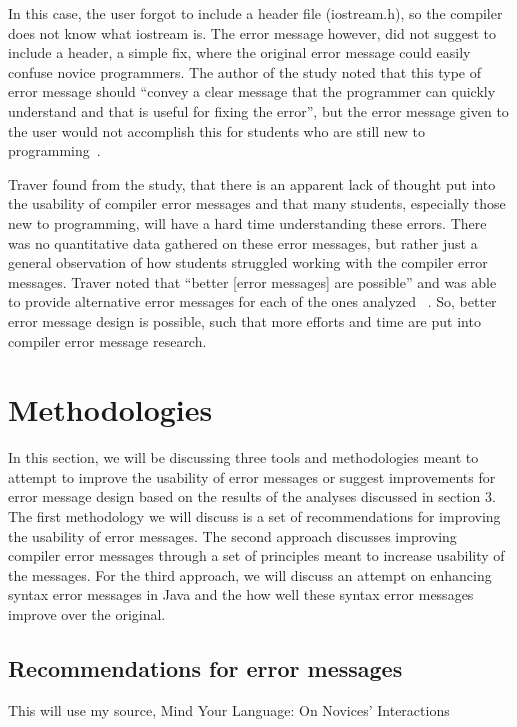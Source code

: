 \documentclass{sig-alternate}
\begin{document}

In this case, the user forgot to include a header file (iostream.h), so the compiler does not know what iostream is.
The error message however, did not suggest to include a header, a simple fix, where the original error message could easily confuse novice programmers.
The author of the study noted that this type of error message should ``convey a clear message that the programmer can quickly understand and that is useful for fixing the error'', but the error message given to the user would not accomplish this for students who are still new to programming~\cite{Traver:2010}.

Traver found from the study, that there is an apparent lack of thought put into the usability of compiler error messages and that many students, especially those new to programming, will have a hard time understanding these errors.
There was no quantitative data gathered on these error messages, but rather just a general observation of how students struggled working with the compiler error messages.
Traver noted that ``better [error messages] are possible'' and was able to provide alternative error messages for each of the ones analyzed ~\cite{Traver:2010}.
So, better error message design is possible, such that more efforts and time are put into compiler error message research. 

\section{Methodologies}\label{sec:methodologies}
In this section, we will be discussing three tools and methodologies meant to attempt to improve the usability of error messages or suggest improvements for error message design based on the results of the analyses discussed in section 3.
The first methodology we will discuss is a set of recommendations for improving the usability of error messages.
The second approach discusses improving compiler error messages through a set of principles meant to increase usability of the messages.
For the third approach, we will discuss an attempt on enhancing syntax error messages in Java and the how well these syntax error messages improve over the original. 

\subsection{Recommendations for error messages}\label{subsec:error message rubric}
This will use my source, Mind Your Language: On Novices' Interactions 
\end{document}
